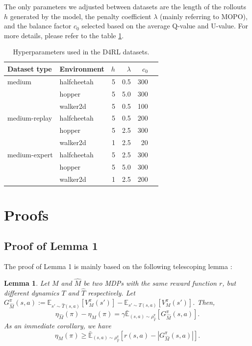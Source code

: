 \documentclass[letterpaper]{article} %
\newtheorem{lemma}{Lemma}
\begin{document}
The only parameters we adjusted between datasets are the length of the rollouts $h$ generated by the model, the penalty coefficient $\lambda$ (mainly referring to MOPO), and the balance factor $c_0$ selected based on the average Q-value and U-value. For more details, please refer to the table \ref{tab:hyper}.

\begin{table}[!ht]
  \centering
  \begin{tabular}{llrrrr}
    \toprule
    \textbf{Dataset type} & \textbf{Environment} & $h$ & $\lambda$ & $c_0$\\
    \midrule
    medium & halfcheetah  & 5 & 0.5 & 300\\
           & hopper  & 5 & 5.0 & 300\\
           & walker2d  & 5 & 0.5 & 100\\

    medium-replay & halfcheetah  & 5 & 0.5 & 200\\
            & hopper & 5 & 2.5 & 300\\
            & walker2d & 1 & 2.5 & 20\\

    medium-expert & halfcheetah  & 5 & 2.5 & 300\\
            & hopper  & 5 & 5.0 & 300\\
            & walker2d  & 1 & 2.5 & 200\\
    \bottomrule
  \end{tabular}
  \caption{Hyperparameters used in the D4RL datasets.}
  \label{tab:hyper}
\end{table}

\section{Proofs}
\label{b}
\subsection{Proof of Lemma 1}

The proof of Lemma 1 is mainly based on the following telescoping lemma \cite{mopo}:

\begin{lemma}
Let $M$ and $\hat{M}$ be two MDPs with the same reward function $r$, but different dynamics $T$ and $\hat{T}$ respectively. Let $G^{\pi}_{\hat{M}} (s, a) := \mathbb{E}_{s'\sim\hat{T}(s,a)}  [V^{\pi}_M (s')] - \mathbb{E}_{s'\sim T (s,a)} [V^{\pi}_M (s')]$. Then,
\begin{equation}\eta_{\hat{M}}(\pi) - \eta_M (\pi) = \gamma  \bar{\mathbb{E}}_{(s,a)\sim \rho^{\pi}_{\hat{T}}} [ G^{\pi}_{\hat{M}} (s, a) ].
\label{eq:telescope1}
\end{equation}
As an immediate corollary, we have
\begin{equation}
\eta_M (\pi)  \geq \bar{\mathbb{E}}_{(s,a)\sim \rho^{\pi}_{\hat{T}}} [ r(s,a)- |G^{\pi}_{\hat{M}} (s, a) |].
\label{eq:telescope2}
\end{equation}
\end{lemma}
\end{document}
